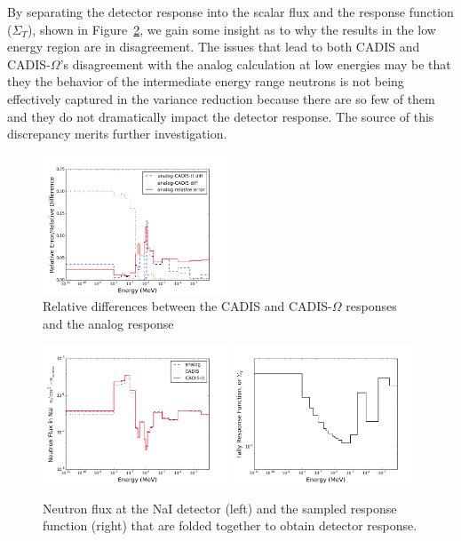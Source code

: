 \documentclass[12pt]{article}
\begin{document}
By separating the detector response into the scalar flux and the response function ($\Sigma_{T}$), shown in Figure~\ref{fig::tallyproducts}, we gain some insight as to why the results in the low energy region are in disagreement.
The issues that lead to both CADIS and CADIS-$\Omega$'s disagreement with the analog calculation at low energies may be that they the behavior of the intermediate energy range neutrons is not being effectively captured in the variance reduction because there are so few of them and they do not dramatically impact the detector response. 
The source of this discrepancy merits further investigation. 
\begin{figure}
  \begin{center}
    \includegraphics[width=0.49\textwidth]{./images/RE_differences.png}
    \caption[]{\label{fig::rediffs} Relative differences between the CADIS and CADIS-$\Omega$ responses and the analog response}
  \end{center}
\end{figure}
%
\begin{figure}
  \begin{center}
    \includegraphics[width=0.49\textwidth]{./images/flux.png}
    \includegraphics[width=0.49\textwidth]{./images/response_function.png}
    \caption[]{\label{fig::tallyproducts} Neutron flux at the NaI detector (left) and the sampled response function (right) that are folded together to obtain detector response. }
  \end{center}
\end{figure}
\end{document}
